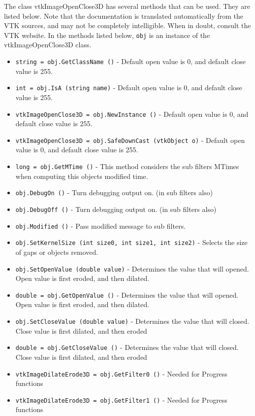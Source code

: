 The class vtkImageOpenClose3D has several methods that can be used.
  They are listed below.
Note that the documentation is translated automatically from the VTK sources,
and may not be completely intelligible.  When in doubt, consult the VTK website.
In the methods listed below, \verb|obj| is an instance of the vtkImageOpenClose3D class.
\begin{itemize}
\item  \verb|string = obj.GetClassName ()| -  Default open value is 0, and default close value is 255.

\item  \verb|int = obj.IsA (string name)| -  Default open value is 0, and default close value is 255.

\item  \verb|vtkImageOpenClose3D = obj.NewInstance ()| -  Default open value is 0, and default close value is 255.

\item  \verb|vtkImageOpenClose3D = obj.SafeDownCast (vtkObject o)| -  Default open value is 0, and default close value is 255.

\item  \verb|long = obj.GetMTime ()| -  This method considers the sub filters MTimes when computing this objects
 modified time.

\item  \verb|obj.DebugOn ()| -  Turn debugging output on. (in sub filters also)

\item  \verb|obj.DebugOff ()| -  Turn debugging output on. (in sub filters also)

\item  \verb|obj.Modified ()| -  Pass modified message to sub filters.

\item  \verb|obj.SetKernelSize (int size0, int size1, int size2)| -  Selects the size of gaps or objects removed.

\item  \verb|obj.SetOpenValue (double value)| -  Determines the value that will opened.  
 Open value is first eroded, and then dilated.

\item  \verb|double = obj.GetOpenValue ()| -  Determines the value that will opened.  
 Open value is first eroded, and then dilated.

\item  \verb|obj.SetCloseValue (double value)| -  Determines the value that will closed.
 Close value is first dilated, and then eroded

\item  \verb|double = obj.GetCloseValue ()| -  Determines the value that will closed.
 Close value is first dilated, and then eroded

\item  \verb|vtkImageDilateErode3D = obj.GetFilter0 ()| -  Needed for Progress functions

\item  \verb|vtkImageDilateErode3D = obj.GetFilter1 ()| -  Needed for Progress functions

\end{itemize}
